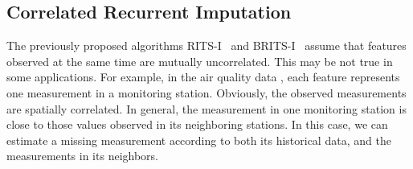 \documentclass{article}
\newcommand{\ritsi}{\xspace{RITS-I}}
\newcommand{\britsi}{\xspace{BRITS-I}}
\begin{document}
 \subsection{Correlated Recurrent Imputation}
\label{sec:feature_dependent}
The previously proposed algorithms \ritsi~ and \britsi~ assume that features observed at the same time are mutually uncorrelated.  This may  be not true in some applications. For example, in the air quality data \cite{yi2016st}, each feature represents one measurement in a monitoring station. Obviously,  the observed measurements are spatially correlated. In general, the measurement in one monitoring station is close to those values observed in its neighboring stations. In this case, we can estimate a missing measurement according to both its historical data, and the measurements in its neighbors.
\end{document}
